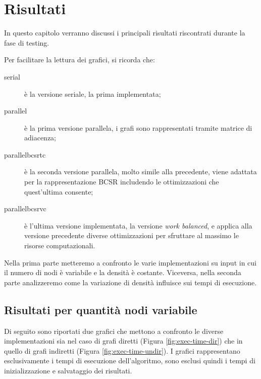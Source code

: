     
        


\chapter{Risultati}\label{chap:Risultati}

    In questo capitolo verranno discussi i principali risultati riscontrati durante la fase di testing. 

    Per facilitare la lettura dei grafici, si ricorda che:
    \begin{description}
        \item[{\color{blue}serial}] è la versione seriale, la prima implementata;
        \item[{\color{red}parallel}] è la prima versione parallela, i grafi sono rappresentati tramite matrice di adiacenza;
        \item[{\color{violet}parallelbcsrtc}] è la seconda versione parallela, molto simile alla precedente, viene adattata per la rappresentazione BCSR includendo le ottimizzazioni che quest'ultima consente;
        \item[{\color{YellowOrange}parallelbcsrvc}] è l'ultima versione implementata, la versione \textit{work balanced}, e applica alla versione precedente diverse ottimizzazioni per sfruttare al massimo le risorse computazionali.
    \end{description}

    Nella prima parte metteremo a confronto le varie implementazioni su input in cui il numero di nodi è variabile e la densità è costante. 
    Viceversa, nella seconda parte analizzeremo come la variazione di densità influisce sui tempi di esecuzione.

    \section{Risultati per quantità nodi variabile}

        Di seguito sono riportati due grafici che mettono a confronto le diverse implementazioni sia nel caso di grafi diretti (Figura \ref{fig:exec-time-dir}) che in quello di grafi indiretti (Figura \ref{fig:exec-time-undir}). I grafici rappresentano esclusivamente i tempi di esecuzione dell'algoritmo, sono esclusi quindi i tempi di inizializzazione e salvataggio dei risultati.

